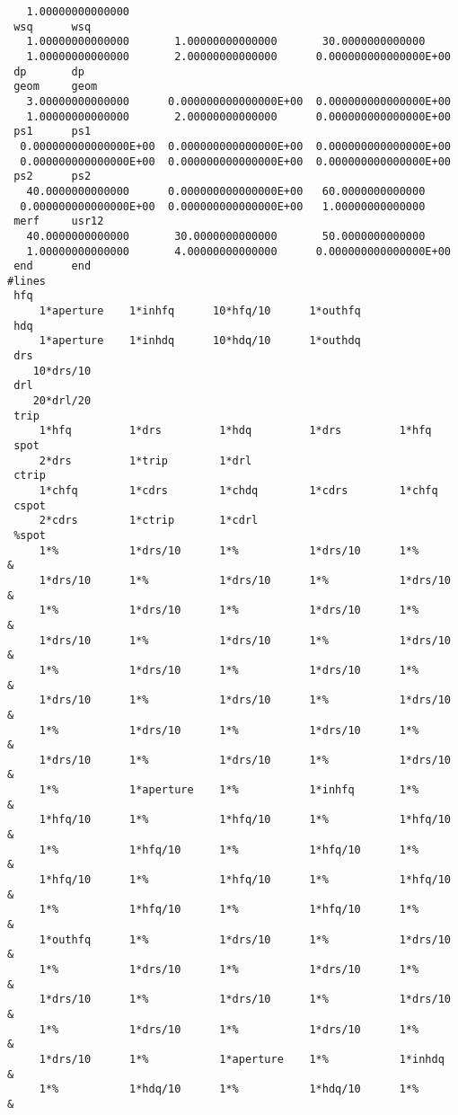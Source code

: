 \begin{footnotesize}
\begin{verbatim}
   1.00000000000000
 wsq      wsq
   1.00000000000000       1.00000000000000       30.0000000000000
   1.00000000000000       2.00000000000000      0.000000000000000E+00
 dp       dp
 geom     geom
   3.00000000000000      0.000000000000000E+00  0.000000000000000E+00
   1.00000000000000       2.00000000000000      0.000000000000000E+00
 ps1      ps1
  0.000000000000000E+00  0.000000000000000E+00  0.000000000000000E+00
  0.000000000000000E+00  0.000000000000000E+00  0.000000000000000E+00
 ps2      ps2
   40.0000000000000      0.000000000000000E+00   60.0000000000000
  0.000000000000000E+00  0.000000000000000E+00   1.00000000000000
 merf     usr12
   40.0000000000000       30.0000000000000       50.0000000000000
   1.00000000000000       4.00000000000000      0.000000000000000E+00
 end      end
#lines
 hfq
     1*aperture    1*inhfq      10*hfq/10      1*outhfq
 hdq
     1*aperture    1*inhdq      10*hdq/10      1*outhdq
 drs
    10*drs/10
 drl
    20*drl/20
 trip
     1*hfq         1*drs         1*hdq         1*drs         1*hfq
 spot
     2*drs         1*trip        1*drl
 ctrip
     1*chfq        1*cdrs        1*chdq        1*cdrs        1*chfq
 cspot
     2*cdrs        1*ctrip       1*cdrl
 %spot
     1*%           1*drs/10      1*%           1*drs/10      1*%        &
     1*drs/10      1*%           1*drs/10      1*%           1*drs/10   &
     1*%           1*drs/10      1*%           1*drs/10      1*%        &
     1*drs/10      1*%           1*drs/10      1*%           1*drs/10   &
     1*%           1*drs/10      1*%           1*drs/10      1*%        &
     1*drs/10      1*%           1*drs/10      1*%           1*drs/10   &
     1*%           1*drs/10      1*%           1*drs/10      1*%        &
     1*drs/10      1*%           1*drs/10      1*%           1*drs/10   &
     1*%           1*aperture    1*%           1*inhfq       1*%        &
     1*hfq/10      1*%           1*hfq/10      1*%           1*hfq/10   &
     1*%           1*hfq/10      1*%           1*hfq/10      1*%        &
     1*hfq/10      1*%           1*hfq/10      1*%           1*hfq/10   &
     1*%           1*hfq/10      1*%           1*hfq/10      1*%        &
     1*outhfq      1*%           1*drs/10      1*%           1*drs/10   &
     1*%           1*drs/10      1*%           1*drs/10      1*%        &
     1*drs/10      1*%           1*drs/10      1*%           1*drs/10   &
     1*%           1*drs/10      1*%           1*drs/10      1*%        &
     1*drs/10      1*%           1*aperture    1*%           1*inhdq    &
     1*%           1*hdq/10      1*%           1*hdq/10      1*%        &

\end{verbatim}
\end{footnotesize}

